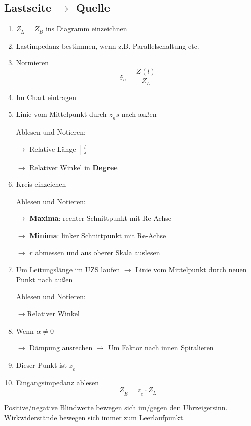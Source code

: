 \subsection[Von Last zu Quelle]{Lastseite $\rightarrow$ Quelle}
\begin{enumerate}
	\item $Z_L = Z_B$ ins Diagramm einzeichnen
	\item Lastimpedanz bestimmen,
	      wenn z.B. Parallelschaltung etc.
	\item Normieren
	      \[\underline{z}_n = \frac{\underline{Z}(l)}{Z_L} \]
	\item Im Chart eintragen
	\item Linie vom Mittelpunkt durch $\underline{z}_ns$ nach außen

	      Ablesen und Notieren:

	      $\rightarrow$ Relative Länge $\left[\frac{l}{\lambda}\right]$

	      $\rightarrow$ Relativer Winkel in \textbf{Degree}
	\item Kreis einzeichen

	      Ablesen und Notieren:

	      $\rightarrow$ \textbf{Maxima}: rechter Schnittpunkt mit Re-Achse

	      $\rightarrow$ \textbf{Minima}: linker Schnittpunkt mit Re-Achse

	      $\rightarrow$ $ \underline{r} $ abmessen und aus oberer Skala auslesen
	\item Um Leitungslänge im UZS laufen
	      $\rightarrow$ Linie vom Mittelpunkt durch neuen Punkt nach außen

	      Ablesen und Notieren:

	      $\rightarrow$Relativer Winkel
	\item Wenn $\alpha\neq 0$

	      $\rightarrow$ Dämpung ausrechen
	      $\rightarrow$ Um Faktor nach innen Spiralieren

	\item Dieser Punkt ist $\underline{z}_e$
	\item Eingangsimpedanz ablesen
	      \[\underline{Z}_E = \underline{z}_e \cdot Z_L\]
\end{enumerate}



Positive/negative Blindwerte bewegen sich im/gegen den Uhrzeigersinn.
Wirkwiderstände bewegen sich immer zum Leerlaufpunkt.

